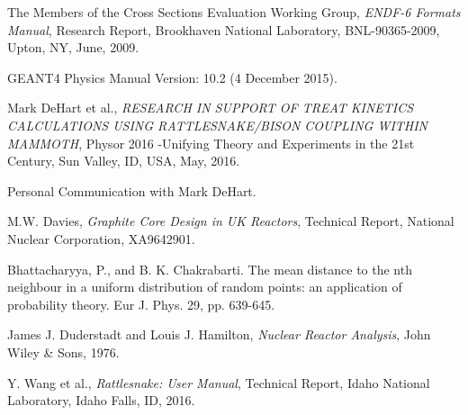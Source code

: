 \documentclass{anstrans}
\begin{document}
\begin{thebibliography}{1}
 The Members of the Cross Sections Evaluation Working Group, {\em ENDF-6 Formats Manual}, Research Report, Brookhaven National Laboratory,
BNL-90365-2009, Upton, NY, June, 2009.  

 GEANT4 Physics Manual Version: 10.2 (4 December 2015). 

 Mark DeHart et al., {\em RESEARCH IN SUPPORT OF TREAT KINETICS CALCULATIONS USING RATTLESNAKE/BISON COUPLING WITHIN MAMMOTH}, Physor 2016 -Unifying Theory and Experiments in the 21st Century, Sun Valley, ID, USA, May, 2016. 

 Personal Communication with Mark DeHart. 

 M.W. Davies, {\em Graphite Core Design in UK Reactors}, Technical Report, National Nuclear Corporation, XA9642901.

 Bhattacharyya, P., and B. K. Chakrabarti. The mean distance to the nth neighbour in a uniform distribution of random points: an application of probability theory. Eur J. Phys. 29, pp. 639-645.

 James J. Duderstadt and Louis J. Hamilton, {\em Nuclear Reactor Analysis}, John Wiley \& Sons, 1976.

 Y. Wang et al., {\em Rattlesnake: User Manual}, Technical Report, Idaho National Laboratory, Idaho Falls, ID, 2016. 

\end{thebibliography}
\end{document}
